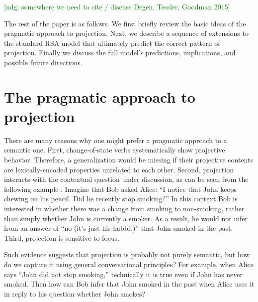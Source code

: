 \documentclass[10pt,letterpaper]{article}
\newcommand{\ndg}[1]{\textcolor{Green}{[ndg: #1]}}
\begin{document}
\ndg{somewhere we need to cite / discuss Degen, Tessler, Goodman 2015}

The rest of the paper is as follows. We first briefly review the basic ideas of the pragmatic approach to projection. 
Next, we describe a sequence of extensions to the standard RSA model that ultimately predict the correct pattern of projection. 
Finally we discuss the full model's predictions, implications, and possible future directions.



\section{The pragmatic approach to projection}
\label{sec:Ex}
%

There are many reasons why one might prefer a pragmatic approach to a 
 semantic one. 
First, change-of-state verbs systematically show projective behavior. 
Therefore, a generalization would be missing if their projective contents are
 lexically-encoded properties unrelated to each other.
Second, projection interacts with the contextual question under discussion,
 as can be seen from the following example \cite{Geurts1995:Presupposing}.
Imagine that Bob asked Alice: ``I notice that John keeps chewing on his pencil. Did he recently stop smoking?''
In this context Bob is interested in whether there was a change from smoking to non-smoking, rather than simply whether John is currently a smoker. 
As a result, he would not infer from an answer of ``no (it's just his habbit)'' that 
 John smoked in the past. 
Third, projection is sensitive to focus.

Such evidence suggests that projection is probably not purely semantic, but how do we 
 capture it using general conversational principles?
For example, when Alice says ``John did not stop smoking,'' technically it is true 
 even if John has never smoked. 
Then how can Bob infer that John smoked in the past when Alice uses it in reply to his question whether John smokes?
\end{document}
